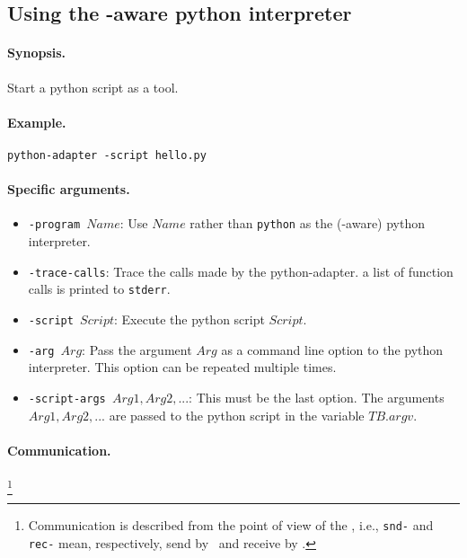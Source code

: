 \subsection{\label{using-python}Using the \TB -aware python interpreter}

\paragraph{Synopsis.} Start a python script as a tool.

\paragraph{Example.} {\tt python-adapter -script hello.py}

\paragraph{Specific arguments.}
\begin{itemize}
\item {\tt -program $Name$}: Use $Name$ rather than {\tt python} as the
(\TB -aware) python interpreter.
\item {\tt -trace-calls}: Trace the calls made by the python-adapter.
      a list of function calls is printed to {\tt stderr}.
\item {\tt -script $Script$}: Execute the python script $Script$.
\item {\tt -arg $Arg$}: Pass the argument $Arg$ as a command line option
to the python interpreter. This option can be repeated multiple times.
\item {\tt -script-args $Arg1, Arg2, ...$}: This must be the last option.
The arguments $Arg1, Arg2, ...$ are passed to the python script in the
variable $TB.argv$.
\end{itemize}

\paragraph{Communication.} \hspace{-0.3cm}\footnote{Communication is described
from the point of view of the \TB, i.e., {\tt snd-} and {\tt rec-}
mean, respectively, send by \TB\ and receive by \TB.}


